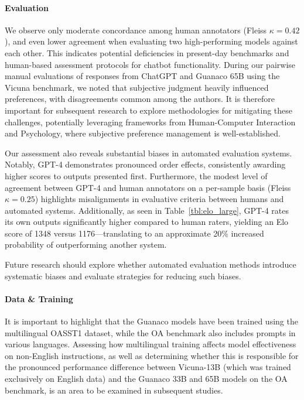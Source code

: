 \paragraph{Evaluation}

We observe only moderate concordance among human annotators (Fleiss $\kappa=0.42$), and even lower agreement when evaluating two high-performing models against each other. This indicates potential deficiencies in present-day benchmarks and human-based assessment protocols for chatbot functionality. During our pairwise manual evaluations of responses from ChatGPT and {Guanaco} 65B using the Vicuna benchmark, we noted that subjective judgment heavily influenced preferences, with disagreements common among the authors. It is therefore important for subsequent research to explore methodologies for mitigating these challenges, potentially leveraging frameworks from Human-Computer Interaction and Psychology, where subjective preference management is well-established.

Our assessment also reveals substantial biases in automated evaluation systems. Notably, GPT-4 demonstrates pronounced order effects, consistently awarding higher scores to outputs presented first. Furthermore, the modest level of agreement between GPT-4 and human annotators on a per-sample basis (Fleiss $\kappa=0.25$) highlights misalignments in evaluative criteria between humans and automated systems. Additionally, as seen in Table~\ref{tbl:elo_large}, GPT-4 rates its own outputs significantly higher compared to human raters, yielding an Elo score of 1348 versus 1176—translating to an approximate 20\% increased probability of outperforming another system.

Future research should explore whether automated evaluation methods introduce systematic biases and evaluate strategies for reducing such biases.

\paragraph{Data \& Training} It is important to highlight that the {Guanaco} models have been trained using the multilingual OASST1 dataset, while the OA benchmark also includes prompts in various languages. Assessing how multilingual training affects model effectiveness on non-English instructions, as well as determining whether this is responsible for the pronounced performance difference between Vicuna-13B (which was trained exclusively on English data) and the {Guanaco} 33B and 65B models on the OA benchmark, is an area to be examined in subsequent studies.


